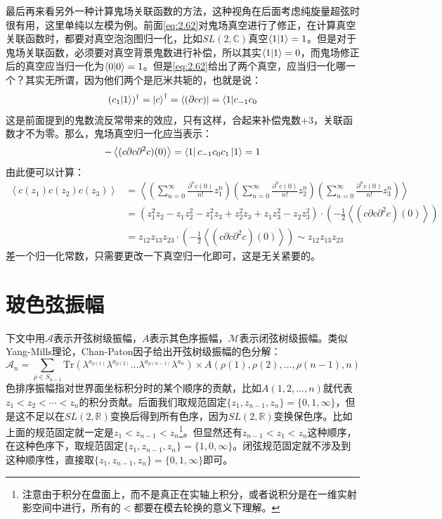 最后再来看另外一种计算鬼场关联函数的方法，这种视角在后面考虑纯旋量超弦时很有用，这里单纯以左模为例。前面\ref{eq:2.62}对鬼场真空进行了修正，在计算真空关联函数时，都要对真空泡泡图归一化，比如$SL(2,\mathbb{C})$真空$\braket{1}=1$。但是对于鬼场关联函数，必须要对真空背景鬼数进行补偿，所以其实$\braket{1}=0$，而鬼场修正后的真空应当归一化为$\braket{0}=1$。但是\ref{eq:2.62}给出了两个真空，应当归一化哪一个？其实无所谓，因为他们两个是厄米共轭的，也就是说：
\begin{equation}
	(c_1|1\rangle)^\dagger=\ket{c}^\dagger = \bra{(\partial c c)}=\langle1|c_{-1}c_0
\end{equation}
这是前面提到的鬼数流反常带来的效应，只有这样，合起来补偿鬼数$+3$，关联函数才不为零。那么，鬼场真空归一化应当表示：
\begin{equation}
	-\left\langle (c\partial c\partial^2c)(0)\right\rangle = \bra{1}c_{-1}c_0c_1\ket{1}=1
\end{equation}
由此便可以计算：
\begin{equation}
\begin{aligned}
		\left\langle c(z_1)c(z_2)c(z_3)\right\rangle &= \left\langle \left(\sum_{n=0}^\infty \frac{\partial^nc(0)}{n!}z_1^n\right) \left(\sum_{n=0}^\infty \frac{\partial^nc(0)}{n!}z_2^n\right)\left(\sum_{n=0}^\infty \frac{\partial^nc(0)}{n!}z_3^n\right)\right\rangle\\
		&=\left(z_1^2 z_2 - z_1 z_2^2 - z_1^2 z_3 + z_2^2 z_3 + z_1 z_3^2 - z_2 z_3^2\right)\cdot \left(-\frac12\left\langle (c\partial c\partial^2c)(0)\right\rangle\right)\\
	&= z_{12}z_{13}z_{23}\cdot\left(-\frac12\left\langle (c\partial c\partial^2c)(0)\right\rangle\right)\sim z_{12}z_{13}z_{23}
\end{aligned}
\end{equation}
差一个归一化常数，只需要更改一下真空归一化即可，这是无关紧要的。
\section{玻色弦振幅}
下文中用$\mathcal{A}$表示开弦树级振幅，$A$表示其色序振幅，$\mathcal{M}$表示闭弦树级振幅。类似Yang-Mills理论，Chan-Paton因子给出开弦树级振幅的色分解：
\begin{equation}
	\mathcal{A}_n=\sum_{\rho\in S_{n-1}}\mathrm{Tr}(\lambda^{a_{\rho(1)}}\lambda^{a_{\rho(2)}}\ldots \lambda^{a_{\rho(n-1)}}\lambda^{a_{n}})\times A(\rho(1),\rho(2),\ldots,\rho(n-1),n)
\end{equation}
色排序振幅指对世界面坐标积分时的某个顺序的贡献，比如$A(1,2,\ldots,n)$就代表$z_1<z_2<\cdots<z_n$的积分贡献。后面我们取规范固定$\{z_1,z_{n-1},z_n\}=\{0,1,\infty\}$，但是这不足以在$SL(2,\mathbb{R})$变换后得到所有色序，因为$SL(2,\mathbb{R})$变换保色序。比如上面的规范固定就一定是$z_1<z_{n-1}<z_n$\footnote{注意由于积分在盘面上，而不是真正在实轴上积分，或者说积分是在一维实射影空间中进行，所有的$<$都要在模去轮换的意义下理解。}。但显然还有$z_{n-1}<z_1<z_n$这种顺序，在这种色序下，取规范固定$\{z_1,z_{n-1},z_n\}=\{1,0,\infty\}$。闭弦规范固定就不涉及到这种顺序性，直接取$\{z_1,z_{n-1},z_n\}=\{0,1,\infty\}$即可。
